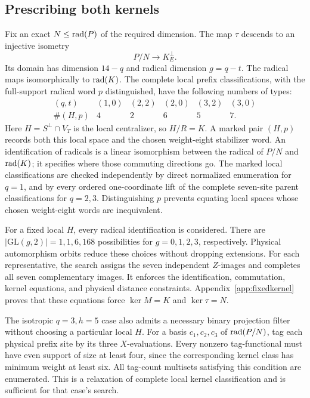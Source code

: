 \subsection{Prescribing both kernels}

Fix an exact \(N\leq\operatorname{rad}(P)\) of the required dimension. The map
\(\tau\) descends to an injective isometry
\[
 P/N\longrightarrow K^\perp_E.
\]
Its domain has dimension \(14-q\) and radical dimension \(g=q-t\).
The radical maps isomorphically to \(\operatorname{rad}(K)\). The complete local
prefix classifications, with the full-support radical word \(p\)
distinguished, have the following numbers of types:
\[
 \begin{array}{c|ccccc}
 (q,t)&(1,0)&(2,2)&(2,0)&(3,2)&(3,0)\\\hline
 \#(H,p)&4&2&6&5&7.
 \end{array}
\]
Here \(H=S^\perp\cap V_T\) is the local centralizer, so
\(H/R=K\). A marked pair \((H,p)\) records both this local space
and the chosen weight-eight stabilizer word. An identification of
radicals is a linear isomorphism between the radical of \(P/N\) and
\(\operatorname{rad}(K)\); it specifies where those commuting directions go.
The marked local classifications are checked independently by direct normalized enumeration for
\(q=1\), and by every ordered one-coordinate lift of the complete
seven-site parent classifications for \(q=2,3\). Distinguishing \(p\) prevents
equating local spaces whose chosen weight-eight words are inequivalent.

For a fixed local \(H\), every radical identification is considered.
There are \(|\mathrm{GL}(g,2)|=1,1,6,168\) possibilities for
\(g=0,1,2,3\), respectively. Physical automorphism orbits reduce these
choices without dropping extensions. For each representative, the search
assigns the seven independent \(Z\)-images and completes all seven
complementary images. It enforces the identification, commutation,
kernel equations, and physical distance constraints.
Appendix~\ref{app:fixedkernel} proves that these equations force
\(\ker M=K\) and \(\ker\tau=N\).

The isotropic \(q=3,h=5\) case also admits a necessary binary
projection filter without choosing a particular local \(H\).
For a basis \(c_1,c_2,c_3\) of \(\operatorname{rad}(P/N)\), tag each physical
prefix site by its three \(X\)-evaluations. Every nonzero tag-functional
must have even support of size at least four, since the corresponding
kernel class has minimum weight at least six. All tag-count multisets satisfying
this condition are enumerated. This is a relaxation of complete local
kernel classification and is sufficient for that case's search.

